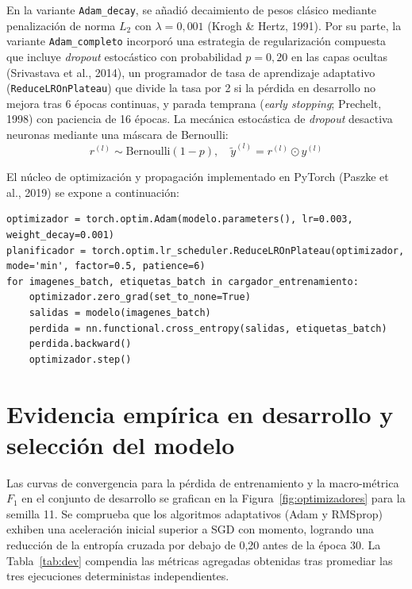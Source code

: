 \documentclass[12pt,letterpaper]{article}
\begin{document}
En la variante \texttt{Adam\_decay}, se añadió decaimiento de pesos clásico mediante penalización de norma $L_2$ con $\lambda = 0{,}001$ (Krogh \& Hertz, 1991). Por su parte, la variante \texttt{Adam\_completo} incorporó una estrategia de regularización compuesta que incluye \textit{dropout} estocástico con probabilidad $p = 0{,}20$ en las capas ocultas (Srivastava et al., 2014), un programador de tasa de aprendizaje adaptativo (\texttt{ReduceLROnPlateau}) que divide la tasa por 2 si la pérdida en desarrollo no mejora tras 6 épocas continuas, y parada temprana (\textit{early stopping}; Prechelt, 1998) con paciencia de 16 épocas. La mecánica estocástica de \textit{dropout} desactiva neuronas mediante una máscara de Bernoulli:
\begin{equation}
r^{(l)} \sim \text{Bernoulli}(1-p), \quad \tilde{y}^{(l)} = r^{(l)} \odot y^{(l)}
\end{equation}

El núcleo de optimización y propagación implementado en PyTorch (Paszke et al., 2019) se expone a continuación:

\begin{singlespace}\begin{lstlisting}
optimizador = torch.optim.Adam(modelo.parameters(), lr=0.003, weight_decay=0.001)
planificador = torch.optim.lr_scheduler.ReduceLROnPlateau(optimizador, mode='min', factor=0.5, patience=6)
for imagenes_batch, etiquetas_batch in cargador_entrenamiento:
    optimizador.zero_grad(set_to_none=True)
    salidas = modelo(imagenes_batch)
    perdida = nn.functional.cross_entropy(salidas, etiquetas_batch)
    perdida.backward()
    optimizador.step()
\end{lstlisting}\end{singlespace}

\section{Evidencia empírica en desarrollo y selección del modelo}
Las curvas de convergencia para la pérdida de entrenamiento y la macro-métrica $F_1$ en el conjunto de desarrollo se grafican en la Figura~\ref{fig:optimizadores} para la semilla 11. Se comprueba que los algoritmos adaptativos (Adam y RMSprop) exhiben una aceleración inicial superior a SGD con momento, logrando una reducción de la entropía cruzada por debajo de 0,20 antes de la época 30. La Tabla~\ref{tab:dev} compendia las métricas agregadas obtenidas tras promediar las tres ejecuciones deterministas independientes.
\end{document}
